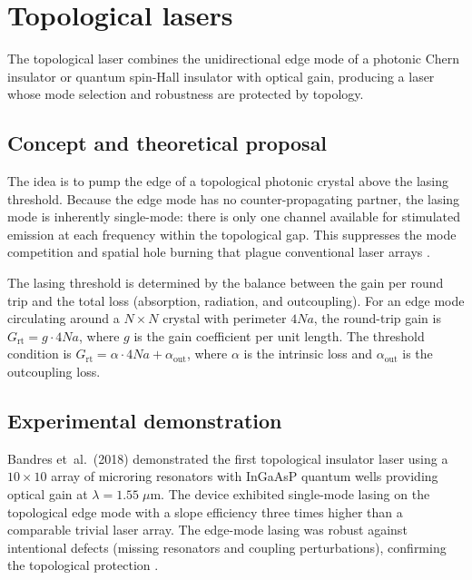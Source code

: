 \section{Topological lasers}
\label{sec:ch18-topological-lasing}

The topological laser combines the unidirectional edge mode of a
photonic Chern insulator or quantum spin-Hall insulator with optical
gain, producing a laser whose mode selection and robustness are
protected by topology.

\subsection{Concept and theoretical proposal}
\label{sec:ch18-laser-concept}

The idea is to pump the edge of a topological photonic crystal above
the lasing threshold.  Because the edge mode has no counter-propagating
partner, the lasing mode is inherently single-mode: there is only one
channel available for stimulated emission at each frequency within the
topological gap.  This suppresses the mode competition and spatial
hole burning that plague conventional laser arrays
\cite{bandres2018topological,ozawa2018topological}.

The lasing threshold is determined by the balance between the
gain per round trip and the total loss (absorption, radiation, and
outcoupling).  For an edge mode circulating around a $N\times N$
crystal with perimeter $4Na$, the round-trip gain is
$G_{\mathrm{rt}}=g\cdot 4Na$, where $g$ is the gain coefficient per
unit length.  The threshold condition is
$G_{\mathrm{rt}}=\alpha\cdot 4Na+\alpha_{\mathrm{out}}$, where
$\alpha$ is the intrinsic loss and $\alpha_{\mathrm{out}}$ is the
outcoupling loss.

\subsection{Experimental demonstration}
\label{sec:ch18-laser-experiment}

Bandres et~al.\ (2018) demonstrated the first topological insulator
laser using a $10\times 10$ array of microring resonators with
InGaAsP quantum wells providing optical gain at
$\lambda=1.55\;\mu\mathrm{m}$.  The device exhibited single-mode
lasing on the topological edge mode with a slope efficiency three
times higher than a comparable trivial laser array.  The edge-mode
lasing was robust against intentional defects (missing resonators and
coupling perturbations), confirming the topological protection
\cite{bandres2018topological}.

